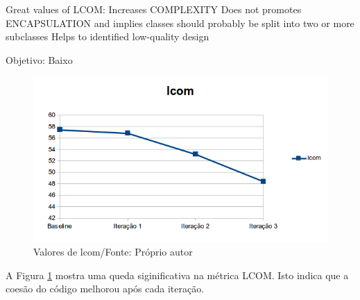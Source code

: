 Great values of LCOM:
Increases COMPLEXITY
Does not promotes  ENCAPSULATION and implies classes should probably be split into two or more subclasses
Helps to identified low-quality design

Objetivo: Baixo

\begin{figure}[h]
	\centering
	\includegraphics{img/lcom.png}
	\caption{Valores de lcom/Fonte: Próprio autor}
	\label{fig:lcom}
\end{figure}

A Figura \ref{fig:lcom} mostra uma queda siginificativa na métrica LCOM. Isto
indica que a coesão do código melhorou após cada iteração. 

